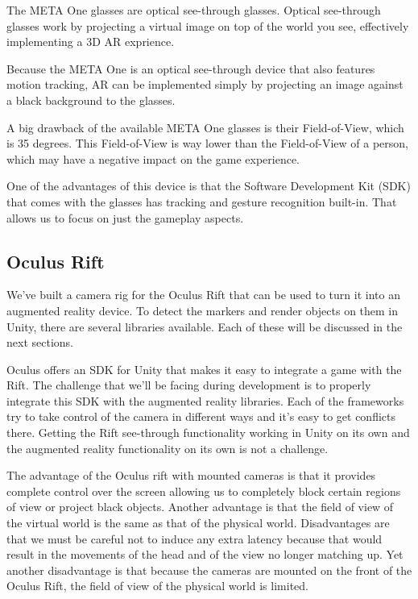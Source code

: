 			The META One glasses are optical see-through glasses. Optical
			see-through glasses work by projecting a virtual image on top of the
			world you see, effectively implementing a 3D AR exprience.

			Because the META One is an optical see-through device that also
			features motion tracking, AR can be implemented simply by
			projecting an image against a black background to the glasses.

			A big drawback of the available META One glasses is their
			Field-of-View, which is 35 degrees. This Field-of-View is way lower
			than the Field-of-View of a person, which may have a negative impact
			on the game experience.

			One of the advantages of this device is that the Software Development
			Kit (SDK) that comes with the glasses has tracking and gesture
			recognition built-in. That allows us to focus on just the gameplay
			aspects.

		\subsection{Oculus Rift} \label{ssec:oculusrift}
			We've built a camera rig for the Oculus Rift that can be used to
			turn it into an augmented reality device. To detect the markers and
			render objects on them in Unity, there are several libraries
			available. Each of these will be discussed in the next sections.

			Oculus offers an SDK for Unity that makes it easy to integrate a
			game with the Rift. The challenge that we'll be facing during
			development is to properly integrate this SDK with the augmented
			reality libraries. Each of the frameworks try to take control of the
			camera in different ways and it's easy to get conflicts there.
			Getting the Rift see-through functionality working in Unity on its
			own and the augmented reality functionality on its own is not a
			challenge.

			The advantage of the Oculus rift with mounted cameras is that it
			provides complete control over the screen allowing us to completely block
			certain regions of view or project black objects. Another advantage is
			that the field of view of the virtual world is the same as that of the
			physical world. Disadvantages are that we must be careful not to induce
			any extra latency because that would result in the movements of the head
			and of the view no longer matching up. Yet another disadvantage is that
			because the cameras are mounted on the front of the Oculus Rift, the
			field of view of the physical world is limited.

